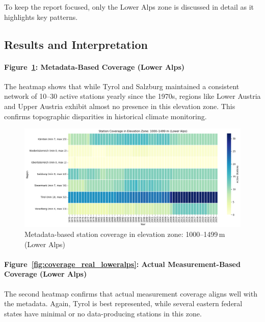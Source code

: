 To keep the report focused, only the Lower Alps zone is discussed in detail as it highlights key patterns.

\subsection*{Results and Interpretation}

\paragraph{Figure~\ref{fig:coverage_meta_loweralps}: Metadata-Based Coverage (Lower Alps)}  
The heatmap shows that while Tyrol and Salzburg maintained a consistent network of 10--30 active stations yearly since the 1970s, regions like Lower Austria and Upper Austria exhibit almost no presence in this elevation zone. This confirms topographic disparities in historical climate monitoring.

\begin{figure}[htbp]
    \centering
    \includegraphics[width=\textwidth]{img/coverage_zone_loweralps_meta.png}
    \caption{Metadata-based station coverage in elevation zone: 1000--1499\,m (Lower Alps)}
    \label{fig:coverage_meta_loweralps}
\end{figure}

\paragraph{Figure~\ref{fig:coverage_real_loweralps}: Actual Measurement-Based Coverage (Lower Alps)}  
The second heatmap confirms that actual measurement coverage aligns well with the metadata. Again, Tyrol is best represented, while several eastern federal states have minimal or no data-producing stations in this zone.

